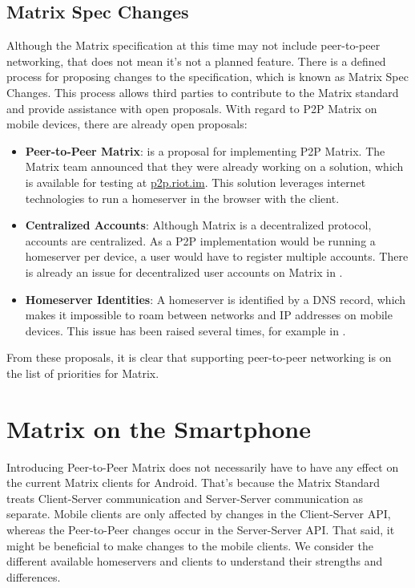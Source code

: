 \subsection{Matrix Spec Changes}\label{subsec:matrix_spec_changes}
Although the Matrix specification at this time may not include peer-to-peer networking, that does not mean it's not a planned feature.
There is a defined process for proposing changes to the specification, which is known as Matrix Spec Changes\cite{matrix_org_spec_changes}.
This process allows third parties to contribute to the Matrix standard and provide assistance with open proposals.
With regard to \ac{P2P} Matrix on mobile devices, there are already open proposals:
\begin{itemize}
	\item{
	      \textbf{Peer-to-Peer Matrix}:
	       is a proposal for implementing \ac{P2P} Matrix.
	      The Matrix team announced that they were already working on a solution, which is available for testing at \url{p2p.riot.im}.
	      This solution leverages internet technologies to run a homeserver in the browser with the client.
	      }
	\item{
	      \textbf{Centralized Accounts}:
	      Although Matrix is a decentralized protocol, accounts are centralized.
	      As a \ac{P2P} implementation would be running a homeserver per device, a user would have to register multiple accounts.
	      There is already an issue for decentralized user accounts on Matrix in .
	      }
	\item{
	      \textbf{Homeserver Identities}:
	      A homeserver is identified by a DNS record, which makes it impossible to roam between networks and IP addresses on mobile devices.
	      This issue has been raised several times, for example in .
	      }
\end{itemize}

From these proposals, it is clear that supporting peer-to-peer networking is on the list of priorities for Matrix.

\section{Matrix on the Smartphone}\label{sec:matrix_on_the_smartphone}
Introducing Peer-to-Peer Matrix does not necessarily have to have any effect on the current Matrix clients for Android.
That's because the Matrix Standard treats Client-Server communication and Server-Server communication as separate.
Mobile clients are only affected by changes in the Client-Server API, whereas the Peer-to-Peer changes occur in the Server-Server API\@.
That said, it might be beneficial to make changes to the mobile clients.
We consider the different available homeservers and clients to understand their strengths and differences.


